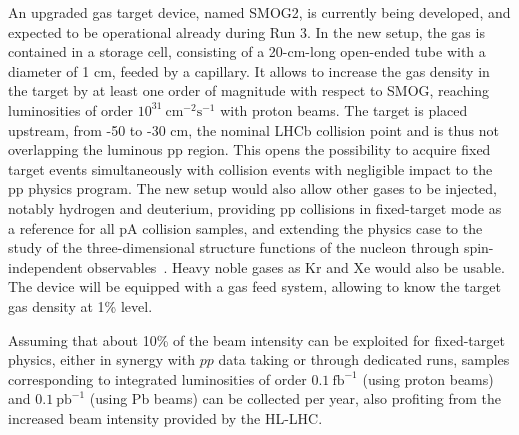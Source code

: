 \documentclass[../report.tex]{subfiles}
\begin{document}
An upgraded gas target device, named SMOG2, is currently being developed, and expected
to be operational already during Run 3. 
In the new setup, the gas is contained in a storage cell, consisting
of a 20-cm-long open-ended tube with a diameter of 1 cm, feeded by a capillary.
It allows to increase the gas density in the target
by at least one order of magnitude with respect to SMOG, reaching
luminosities of order $10^{31}~\text{cm}^{-2}\text{s}^{-1}$ with
proton beams.
The target is placed upstream, from -50 to -30 cm, the nominal  LHCb
collision point and is thus not overlapping the luminous pp region.
This opens the possibility to acquire fixed target events
simultaneously with collision events with negligible impact to the
pp physics program.
The new setup would also allow other gases to be injected, notably hydrogen and deuterium, providing
pp collisions in fixed-target mode as a reference for all pA
collision samples, and extending the physics case to the study
of the three-dimensional structure functions of the nucleon through
spin-independent observables~\cite{3dpdf}. Heavy noble gases as Kr
and Xe would also be usable.
The device will be equipped with a gas feed system, allowing
to know the target gas density at 1\% level.

Assuming that about 10\% of the beam intensity can be exploited for
fixed-target physics, either in synergy with $pp$ data taking or through dedicated runs,
samples corresponding to integrated luminosities of order $0.1~\textrm{fb}^{-1}$
(using proton beams) and $0.1~\textrm{pb}^{-1}$ (using Pb beams) 
can be collected per year, also profiting from the increased beam
intensity provided by the HL-LHC.
\end{document}
